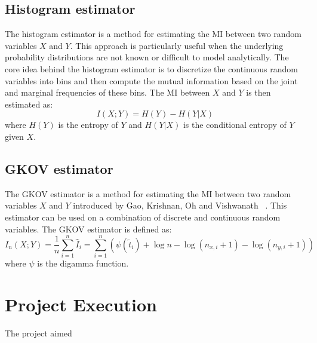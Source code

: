 \documentclass[12pt]{article}
\begin{document}
    \subsection{Histogram estimator}\label{subsec:hist}
    The histogram estimator is a method for estimating the MI between two random variables $X$ and $Y$.
    This approach is particularly useful when the underlying probability distributions are not known or difficult to model analytically.
    The core idea behind the histogram estimator is to discretize the continuous random variables into bins and then compute the mutual information based on the joint and marginal frequencies of these bins.
    The MI between $X$ and $Y$ is then estimated as:
    \begin{equation}
        I(X;Y) = H(Y) - H(Y|X)\label{eq:hist}
    \end{equation}
    where $H(Y)$ is the entropy of $Y$ and $H(Y|X)$ is the conditional entropy of $Y$ given $X$.

    \subsection{GKOV estimator}\label{subsec:gkov}
    The GKOV estimator is a method for estimating the MI between two random variables $X$ and $Y$ introduced by Gao, Krishnan, Oh and Vishwanath ~\cite{gkov}.
    This estimator can be used on a combination of discrete and continuous random variables.
    The GKOV estimator is defined as:
    \begin{equation}
        I_n(X;Y) = \frac{1}{n} \sum_{i=1}^n \hat{I}_i = \sum_{i=1}^n \left( \psi(\tilde{t}_i) + \log n - \log(n_{x,i}+1) - \log(n_{y,i}+1) \right)\label{eq:gkov}
    \end{equation}
    where $\psi$ is the digamma function.

    \section{Project Execution}\label{sec:execution}
    The project aimed
    \newpage
    
    
\end{document}
